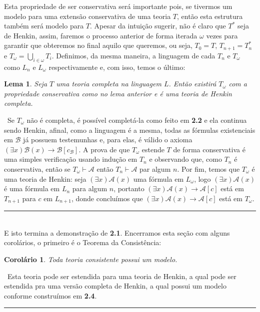 \documentclass[11pt,a4paper]{article}
\newtheorem{lem}[mydef]{Lema}
\newtheorem{cor}[mydef]{Corolário}
\def\dem{\par\smallbreak\noindent {\textit{ Demonstração:}} \ }
\def\eop{\hfill\rule{2.5mm}{2.5mm} \\ }
\theoremstyle{definition}
\begin{document}
Esta propriedade de ser conservativa será importante pois, se tivermos um modelo para uma extensão conservativa de uma teoria $T$, então esta estrutura também será modelo para $T$. Apesar da intuição sugerir, não é claro que $T^*$ seja de Henkin, assim, faremos o processo anterior de forma iterada $\omega$ vezes para garantir que obteremos no final aquilo que queremos, ou seja, $T_0=T$, $T_{n+1}=T_n^*$ e $T_\omega =\bigcup_{i\in \omega}T_i$. Definimos, da mesma maneira, a linguagem de cada $T_n$ e $T_\omega$ como $L_n$ e $L_\omega$ respectivamente e, com isso, temos o último:

\begin{lem}
	
	Seja $T$ uma teoria completa na linguagem $L$. Então existirá $T_\omega$ com a propriedade conservativa como no lema anterior e é uma teoria de Henkin completa.
	
\end{lem}

\dem  Se $T_\omega$ não é completa, é possível completá-la como feito em\textbf{ 2.2} e ela continua sendo Henkin, afinal, como a linguagem é a mesma, todas as fórmulas existenciais em $\mathscr{B}$ já possuem testemunhas e, para elas, é válido o axioma $(\exists x)\mathscr{B}(x)\rightarrow \mathscr{B}[c_{\mathscr{B}}]$. A prova de que $T_\omega$ estende $T$ de forma conservativa é uma simples verificação usando indução em $T_n$ e observando que, como $T_n$ é conservativa, então se $T_\omega\vdash \mathscr{A}$ então $T_n\vdash \mathscr{A}$ par algum $n$. Por fim, temos que $T_\omega$ é uma teoria de Henkin: seja $(\exists x)\mathscr{A}(x)$ uma fórmula em $L_\omega$, logo $(\exists x)\mathscr{A}(x)$ é uma fórmula em $L_n$ para algum $n$, portanto $(\exists x)\mathscr{A}(x)\rightarrow \mathscr{A}[c]$ está em $T_{n+1}$ para $c$ em $L_{n+1}$, donde concluímos que $(\exists x)\mathscr{A}(x)\rightarrow \mathscr{A}[c]$ está em $T_\omega$. \eop

E isto termina a demonstração de \textbf{2.1}. Encerramos esta seção com alguns corolários, o primeiro é o Teorema da Consistência:

\begin{cor}
	
	Toda teoria consistente possui um modelo.
	
\end{cor}

\dem Esta teoria pode ser estendida para uma teoria de Henkin, a qual pode ser estendida pra uma versão completa de Henkin, a qual possui um modelo conforme construímos em \textbf{2.4}. \eop
\end{document}
